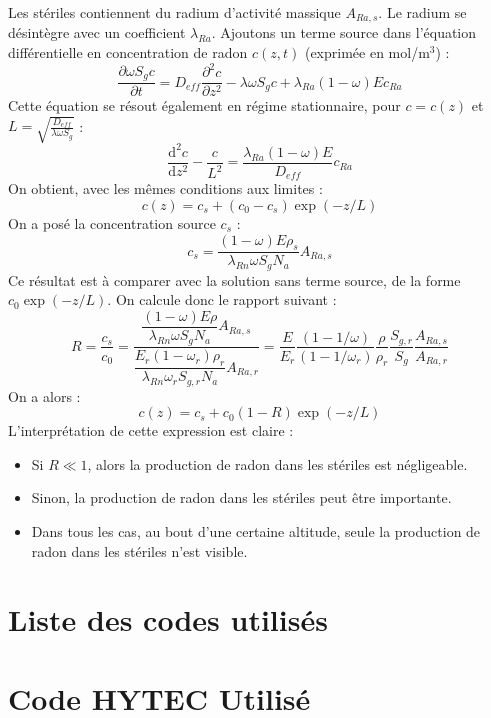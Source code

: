 \documentclass{article}
\begin{document}
Les stériles contiennent du radium d’activité massique $A_{Ra,s}$. Le radium se désintègre avec un coefficient $\lambda_{Ra}$. Ajoutons un terme source dans l’équation différentielle en concentration de radon $c(z,t)$ (exprimée en mol/m$^3$) :
$$
\frac{\partial \omega S_g c}{\partial t} = D_{eff}  \frac{\partial^2 c}{\partial z^2}-\lambda \omega S_g c + \lambda_{Ra}(1-\omega)E c_{Ra}
$$
Cette équation se résout également en régime stationnaire, pour $c=c(z)$ et $L=\sqrt{\frac{D_{eff}}{\lambda \omega S_g }}$ :
$$
\frac{\text{d}^2 c}{\text{d}z^2} - \frac{c}{L^2}= \frac{\lambda_{Ra}(1-\omega)E}{D_{eff}} c_{Ra}
$$
On obtient, avec les mêmes conditions aux limites :
$$
c(z)= c_s + (c_0 - c_s) \exp(-z/L)
$$
On a posé la concentration source $c_s$ :
$$
c_s = \frac{(1-\omega)E\rho_s}{\lambda_{Rn}\omega S_g N_a} A_{Ra,s} 
$$
Ce résultat est à comparer avec la solution sans terme source, de la forme $c_0 \exp(-z/L)$. On calcule donc le rapport suivant :
$$
R=\dfrac{c_s}{c_0}= \dfrac{\dfrac{(1-\omega)E\rho}{\lambda_{Rn}\omega S_g N_a} A_{Ra,s}}{\dfrac{ E_r (1-\omega_r) \rho_r }{\lambda_{Rn} \omega_r S_{g,r} N_a} A_{Ra,r}} = \frac{E}{E_r} \frac{(1-1/\omega)}{(1-1/\omega_r)} \frac{\rho}{\rho_r} \frac{S_{g,r}}{S_g} \frac{A_{Ra,s}}{A_{Ra,r}}
$$
On a alors :
$$
c(z)=c_s + c_0(1-R) \exp(-z/L)
$$
L'interprétation de cette expression est claire :
\begin{itemize}
  \item Si $R\ll 1$, alors la production de radon dans les stériles est négligeable.
  \item Sinon, la production de radon dans les stériles peut être importante.
  \item Dans tous les cas, au bout d'une certaine altitude, seule la production de radon dans les stériles n'est visible.
\end{itemize}

\renewcommand\lstlistingname{Code n°}
\renewcommand\lstlistlistingname{}
\newpage
\section{Liste des codes utilisés}
\lstlistoflistings
\newpage
\section{Code HYTEC Utilisé }
\label{lst:modele_hydro_chimie_final}

\newpage

\newpage

\end{document}
